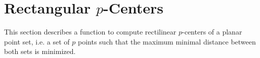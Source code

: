 
\clearpage
\section{Rectangular $p$-Centers}
\label{sec_RectangularPCenters}
\cgalColumnLayout

This section describes a function to compute rectilinear $p$-centers
of a planar point set, i.e. a set of $p$ points such that the maximum
minimal distance between both sets is minimized.

